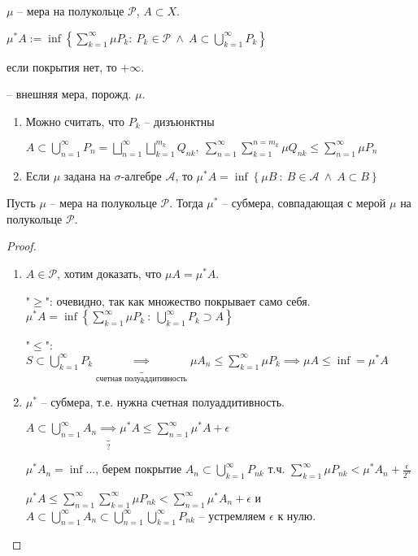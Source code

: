\begin{definition}
    $\mu$ -- мера на полукольце $\mathcal{P}$, $A \subset X$.

    $\mu^* A := \inf{ \left\{\sum_{k=1}^{\infty} \mu P_k: \ P_k \in \mathcal{P} \ \land \ A \subset \bigcup_{k=1}^{\infty} P_k \right\}}$

    если покрытия нет, то $+\infty$.

    -- внешняя мера, порожд. $\mu$.
\end{definition}
\begin{remark}
    \begin{enumerate}
        \item {
            Можно считать, что $P_k$ -- дизъюнктны

            $A \subset \bigcup_{n=1}^{\infty} P_n = \bigsqcup_{n=1}^{\infty} \bigsqcup_{k=1}^{m_k} Q_{nk}, \ \sum_{n=1}^{\infty} \sum_{k=1}^{n=m_k} \mu Q_{nk} \leq \sum_{n=1}^{\infty} \mu P_n$
        }
        \item {
            Если $\mu$ задана на $\sigma$-алгебре $\mathcal{A}$, то $\mu^* A = \inf \left\{\mu B \ : \ B \in \mathcal{A} \ \land \ A \subset B \right\}$
        }
    \end{enumerate}
\end{remark}


\begin{theorem}
    Пусть $\mu$ -- мера на полукольце $\mathcal{P}$. Тогда $\mu^*$ -- субмера, совпадающая с мерой $\mu$ на полукольце $\mathcal{P}$.
\end{theorem}
\begin{proof}
    \begin{enumerate}
        \item {
            $A \in \mathcal{P}$, хотим доказать, что $\mu A = \mu^* A$.

            "$\geq$": очевидно, так как множество покрывает само себя. $\mu^* A = \inf\left\{ \sum_{k=1}^{\infty} \mu P_k \ : \ \bigcup_{k=1}^{\infty} P_k \supset A \right\}$

            "$\leq$": $S \subset \bigcup_{k=1}^{\infty} P_k \underbrace{\implies}_{\text{счетная полуаддитивность}} \mu A_n \leq \sum_{k=1}^{\infty} \mu P_k \implies \mu A \leq \inf = \mu^* A$
        }
        \item {
            $\mu^*$ -- субмера, т.е. нужна счетная полуаддитивность.

            $A \subset \bigcup_{n=1}^{\infty} A_n \underbrace{\implies}_{?} \mu^* A \leq \sum_{n=1}^{\infty} \mu^* A + \epsilon$

            $\mu^* A_n = \inf ... $, берем покрытие $A_n \subset \bigcup_{k=1}^{\infty} P_{nk}$ т.ч. $\sum_{k=1}^{\infty} \mu P_{nk} < \mu^* A_n + \frac{\epsilon}{2^n}$

            $\mu^* A \leq \sum_{n=1}^{\infty} \sum_{k=1}^{\infty} \mu P_{nk} < \sum_{n=1}^{\infty} \mu^* A_n + \epsilon$ и $A \subset \bigcup_{n=1}^{\infty} A_n \subset \bigcup_{n=1}^{\infty} \bigcup_{k=1}^{\infty} P_{nk}$ -- устремляем $\epsilon$ к нулю.

        }
    \end{enumerate}
\end{proof}

